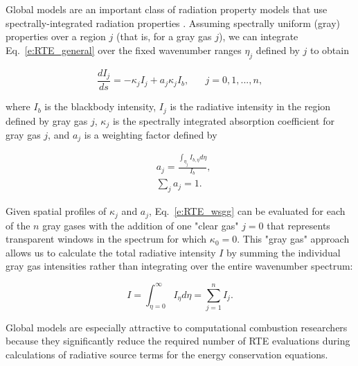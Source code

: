 \documentclass[preprint,12pt]{elsarticle}
\newcounter{bla}
\begin{document}
Global models are an important class of radiation property models that use spectrally-integrated radiation properties \cite{Hottel_1967,Modest_2013,Modest_2016}. Assuming spectrally uniform (gray) properties over a region $j$ (that is, for a gray gas $j$), we can integrate Eq.~\ref{e:RTE_general} over the fixed wavenumber ranges $\eta_j$ defined by $j$ to obtain 
%
\begin{linenomath}
\begin{equation} \label{e:RTE_wsgg}
	\frac{dI_j}{ds} = -\kappa_jI_j + a_j\kappa_jI_b, \hspace{20pt} j=0,1,...,n,
\end{equation}
\end{linenomath}
%
where $I_b$ is the blackbody intensity, $I_j$ is the radiative intensity in the region defined by gray gas $j$, $\kappa_j$ is the spectrally integrated absorption coefficient for gray gas $j$, and $a_j$ is a weighting factor defined by
%
\begin{linenomath}
\begin{align}
    &a_j= \frac{\int_{\eta_j}I_{b,\eta}d\eta}{I_b},\\
    &\sum_j a_j = 1.
\end{align}
\end{linenomath}
%
Given spatial profiles of $\kappa_j$ and $a_j$, Eq.~\ref{e:RTE_wsgg} can be evaluated for each of the $n$ gray gases with the addition of one "clear gas" $j=0$ that represents transparent windows in the spectrum for which $\kappa_0=0$. This "gray gas" approach allows us to calculate the total radiative intensity $I$ by summing the individual gray gas intensities rather than integrating over the entire wavenumber spectrum: 
%
\begin{linenomath}
\begin{equation}
	I=\int_{\eta=0}^{\infty}I_{\eta}d\eta=\sum_{j=1}^n I_j.
\end{equation}
\end{linenomath}
%
Global models are especially attractive to computational combustion researchers because they significantly reduce the required number of RTE evaluations during calculations of radiative source terms for the energy conservation equations. 
\end{document}
